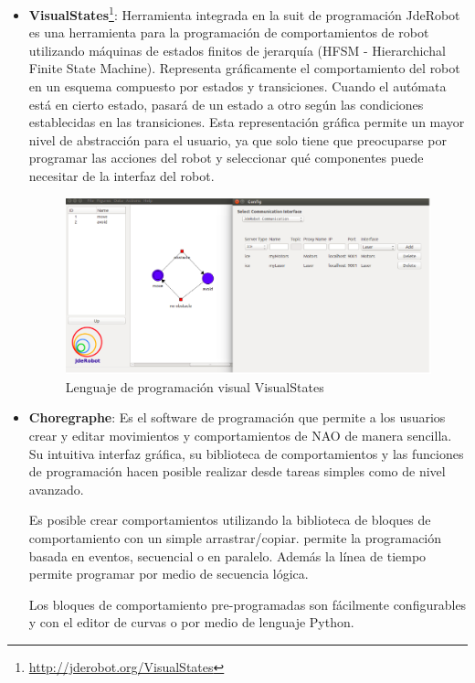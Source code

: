 \begin{itemize}
\item \textbf{VisualStates}\footnote{\url{http://jderobot.org/VisualStates}}: Herramienta integrada en la suit de programación JdeRobot es una herramienta para la programación de comportamientos de robot utilizando máquinas de estados finitos de jerarquía (HFSM - Hierarchichal Finite State Machine). Representa gráficamente el comportamiento del robot en un esquema compuesto por estados y transiciones. Cuando el autómata está en cierto estado, pasará de un estado a otro según las condiciones establecidas en las transiciones. Esta representación gráfica permite un mayor nivel de abstracción para el usuario, ya que solo tiene que preocuparse por programar las acciones del robot y seleccionar qué componentes puede necesitar de la interfaz del robot.\\


\begin{figure}[H]
\centering
\includegraphics[scale=0.40]{img/visualstates.png}
\caption{Lenguaje de programación visual VisualStates}
\label{fig:visualstates}
\end{figure}

\item \textbf{Choregraphe}: Es el software de programación que permite a los usuarios crear y editar movimientos y comportamientos de NAO de manera sencilla. Su intuitiva interfaz gráfica, su biblioteca de comportamientos y las funciones de programación hacen posible realizar desde tareas simples como de nivel avanzado.

Es posible crear comportamientos utilizando la biblioteca de bloques de comportamiento con un simple arrastrar/copiar.
permite la programación basada en eventos, secuencial o en paralelo. Además la línea de tiempo permite programar por medio de secuencia lógica.

Los bloques de comportamiento pre-programadas son fácilmente configurables y con el editor de curvas o por medio de lenguaje Python.\\


\end{itemize}